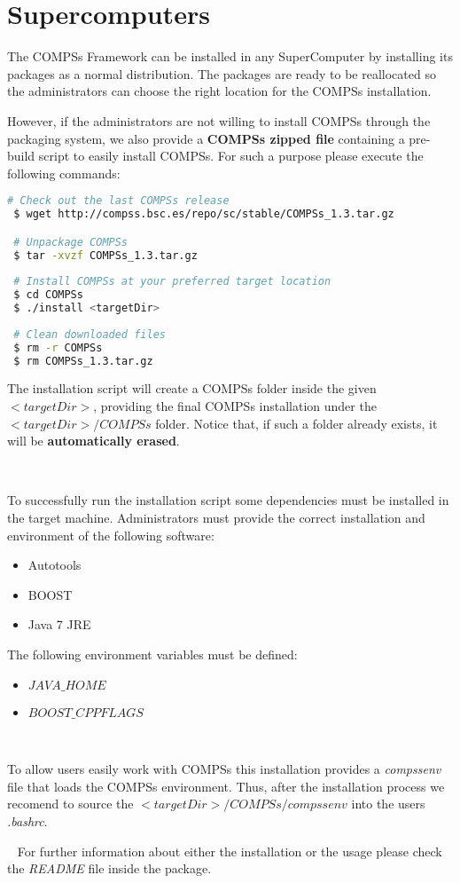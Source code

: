 \section{Supercomputers}
\label{sec:Supercomputers}

The COMPSs Framework can be installed in any SuperComputer by installing its packages as a normal distribution. The packages are
ready to be reallocated so the administrators can choose the right location for the COMPSs installation. \newline

However, if the administrators are not willing to install COMPSs through the packaging system, we also provide a \textbf{COMPSs zipped file} containing
a pre-build script to easily install COMPSs. For such a purpose please execute the following commands:
\begin{lstlisting}[language=bash]
 # Check out the last COMPSs release
 $ wget http://compss.bsc.es/repo/sc/stable/COMPSs_1.3.tar.gz

 # Unpackage COMPSs
 $ tar -xvzf COMPSs_1.3.tar.gz
 
 # Install COMPSs at your preferred target location
 $ cd COMPSs
 $ ./install <targetDir>
 
 # Clean downloaded files
 $ rm -r COMPSs
 $ rm COMPSs_1.3.tar.gz
\end{lstlisting}

The installation script will create a COMPSs folder inside the given $<targetDir>$, providing the final COMPSs installation 
under the $<targetDir>/COMPSs$ folder. Notice that, if such a folder already exists, it will be \textbf{automatically erased}.

~ \newline

To successfully run the installation script some dependencies must be installed in the target machine. Administrators must provide the correct
installation and environment of the following software:
\begin{itemize}
 \item Autotools
 \item BOOST
 \item Java 7 JRE
\end{itemize}

The following environment variables must be defined:
\begin{itemize}
 \item $JAVA\_HOME$
 \item $BOOST\_CPPFLAGS$
\end{itemize}

~ \newline

To allow users easily work with COMPSs this installation provides a \textit{compssenv} file that loads the COMPSs environment. Thus, after the 
installation process we recomend to source the $<targetDir>/COMPSs/compssenv$ into the users \textit{.bashrc}.


~ \newline
For further information about either the installation or the usage please check the \textit{README} file inside the package. 
